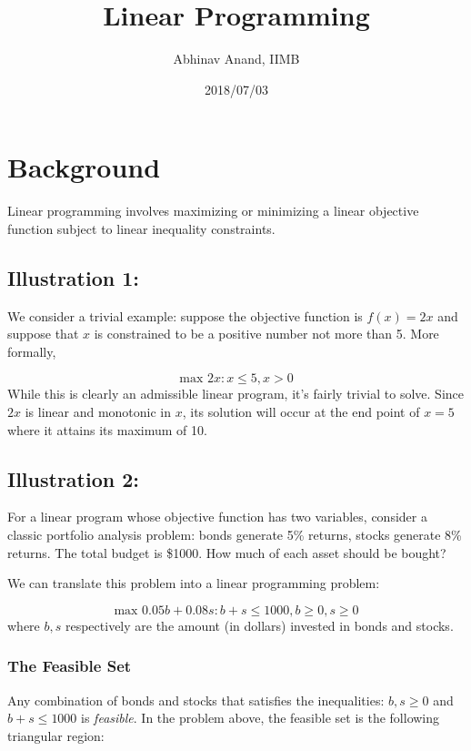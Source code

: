 \documentclass[11pt,]{article}
\title{Linear Programming}
\author{Abhinav Anand, IIMB}
\date{2018/07/03}
\begin{document}
\maketitle

\section{Background}\label{background}

Linear programming involves maximizing or minimizing a linear objective
function subject to linear inequality constraints.

\subsection{Illustration 1:}\label{illustration-1}

We consider a trivial example: suppose the objective function is
\(f(x) = 2x\) and suppose that \(x\) is constrained to be a positive
number not more than 5. More formally,

\[
\text{max } 2x: x\leq 5, x>0
\] While this is clearly an admissible linear program, it's fairly
trivial to solve. Since \(2x\) is linear and monotonic in \(x\), its
solution will occur at the end point of \(x=5\) where it attains its
maximum of 10.

\subsection{Illustration 2:}\label{illustration-2}

For a linear program whose objective function has two variables,
consider a classic portfolio analysis problem: bonds generate 5\%
returns, stocks generate 8\% returns. The total budget is \$1000. How
much of each asset should be bought?

We can translate this problem into a linear programming problem:

\[
\text{max } 0.05b+0.08s: b+s\leq 1000, b \geq 0, s \geq 0
\] where \(b, s\) respectively are the amount (in dollars) invested in
bonds and stocks.

\subsubsection{The Feasible Set}\label{the-feasible-set}

Any combination of bonds and stocks that satisfies the inequalities:
\(b ,s \geq 0\) and \(b+s\leq 1000\) is \emph{feasible}. In the problem
above, the feasible set is the following triangular region:
\end{document}
